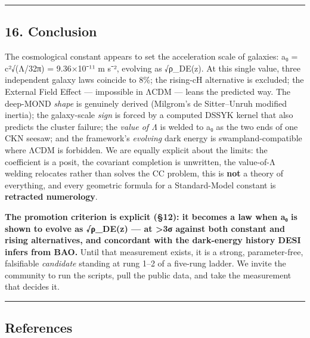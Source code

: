 \documentclass[
]{article}
\begin{document}
\begin{center}\rule{0.5\linewidth}{0.5pt}\end{center}

\subsection{16. Conclusion}\label{conclusion}

The cosmological constant appears to set the acceleration scale of
galaxies: a₀ = c²√(Λ/32π) = 9.36×10⁻¹¹ m s⁻², evolving as √ρ\_DE(z). At
this single value, three independent galaxy laws coincide to 8\%; the
rising-cH alternative is excluded; the External Field Effect ---
impossible in ΛCDM --- leans the predicted way. The deep-MOND
\emph{shape} is genuinely derived (Milgrom's de Sitter--Unruh modified
inertia); the galaxy-scale \emph{sign} is forced by a computed DSSYK
kernel that also predicts the cluster failure; the \emph{value of Λ} is
welded to a₀ as the two ends of one CKN seesaw; and the framework's
\emph{evolving} dark energy is swampland-compatible where ΛCDM is
forbidden. We are equally explicit about the limits: the coefficient is
a posit, the covariant completion is unwritten, the value-of-Λ welding
relocates rather than solves the CC problem, this is \textbf{not} a
theory of everything, and every geometric formula for a Standard-Model
constant is \textbf{retracted numerology}.

\textbf{The promotion criterion is explicit (§12): it becomes a law when
a₀ is shown to evolve as √ρ\_DE(z) --- at \textgreater3σ against both
constant and rising alternatives, and concordant with the dark-energy
history DESI infers from BAO.} Until that measurement exists, it is a
strong, parameter-free, falsifiable \emph{candidate} standing at rung
1--2 of a five-rung ladder. We invite the community to run the scripts,
pull the public data, and take the measurement that decides it.

\begin{center}\rule{0.5\linewidth}{0.5pt}\end{center}

\subsection{References}\label{references}
\end{document}
